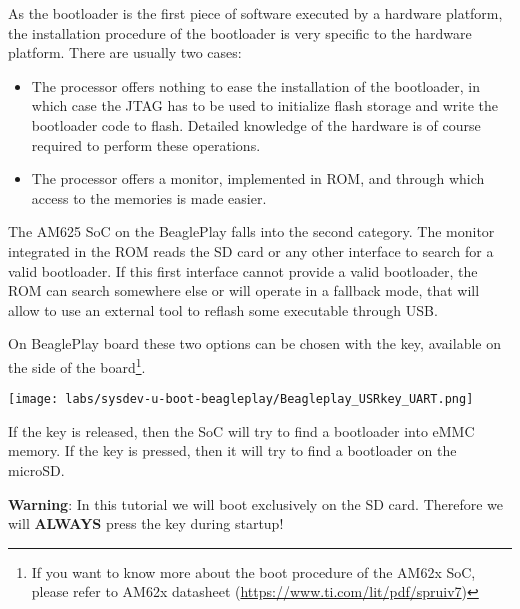 
As the bootloader is the first piece of software executed by a
hardware platform, the installation procedure of the bootloader is
very specific to the hardware platform. There are usually two cases:

\begin{itemize}

\item The processor offers nothing to ease the installation of the
  bootloader, in which case the JTAG has to be used to initialize
  flash storage and write the bootloader code to flash. Detailed
  knowledge of the hardware is of course required to perform these
  operations.

\item The processor offers a monitor, implemented in ROM, and through
  which access to the memories is made easier.

\end{itemize}

The AM625 SoC on the BeaglePlay falls into the second category. The monitor
integrated in the ROM reads the SD card or any other interface to search for
a valid bootloader. If this first interface cannot provide a valid bootloader,
the ROM can search somewhere else or will operate in a fallback mode, that will allow
to use an external tool to reflash some executable through USB.

On BeaglePlay board these two options can be chosen with the 
key, available on the side of the board\footnote{If you want to know more about
the boot procedure of the AM62x SoC, please refer to AM62x datasheet
(\url{https://www.ti.com/lit/pdf/spruiv7})}.

\begin{center}
    \texttt{[image: labs/sysdev-u-boot-beagleplay/Beagleplay\_USRkey\_UART.png]}
\end{center}

If the  key is released, then the SoC will try to find a
bootloader into eMMC memory.
If the  key is pressed, then it will try to find a bootloader
on the microSD.

{\bf Warning}: In this tutorial we will boot exclusively on the SD card. Therefore
we will \textbf{ALWAYS} press the  key during startup!

